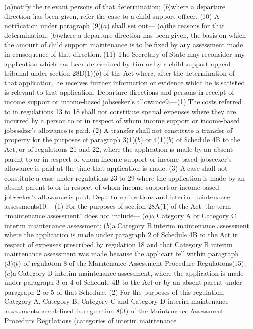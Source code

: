 \documentclass[a4paper]{article}
\begin{document}
($a$)notify the relevant persons of that determination;
($b$)where a departure direction has been given, refer the case to a child support
officer.
(10) A notification under paragraph (9)($a$) shall set out—
($a$)the reasons for that determination;
($b$)where a departure direction has been given, the basis on which the amount of
child support maintenance is to be fixed by any assessment made in consequence
of that direction.
(11) The Secretary of State may reconsider any application which has been
determined by him or by a child support appeal tribunal under section 28D(1)($b$)
of the Act where, after the determination of that application, he receives
further information or evidence which he is satisfied is relevant to that
application.
Departure directions and persons in receipt of income support or income-based
jobseeker’s allowance9.—(1) The costs referred to in regulations 13 to 18 shall
not constitute special expenses where they are incurred by a person to or in
respect of whom income support or income-based jobseeker’s allowance is paid.
(2) A transfer shall not constitute a transfer of property for the purposes of
paragraph 3(1)($b$) or 4(1)($b$) of Schedule 4B to the Act, or of regulations 21 and
22, where the application is made by an absent parent to or in respect of whom
income support or income-based jobseeker’s allowance is paid at the time that
application is made.
(3) A case shall not constitute a case under regulations 23 to 29 where the
application is made by an absent parent to or in respect of whom income support
or income-based jobseeker’s allowance is paid.
Departure directions and interim maintenance assessments10.—(1) For the purposes
of section 28A(1) of the Act, the term “maintenance assessment” does not
include—
($a$)a Category A or Category C interim maintenance assessment;
($b$)a Category B interim maintenance assessment where the application is made
under paragraph 2 of Schedule 4B to the Act in respect of expenses prescribed by
regulation 18 and that Category B interim maintenance assessment was made
because the applicant fell within paragraph (3)($b$) of regulation 8 of the
Maintenance Assessment Procedure Regulations(15);
($c$)a Category D interim maintenance assessment, where the application is made
under paragraph 3 or 4 of Schedule 4B to the Act or by an absent parent under
paragraph 2 or 5 of that Schedule.
(2) For the purposes of this regulation, Category A, Category B, Category C and
Category D interim maintenance assessments are defined in regulation 8(3) of the
Maintenance Assessment Procedure Regulations (categories of interim maintenance
\end{document}
